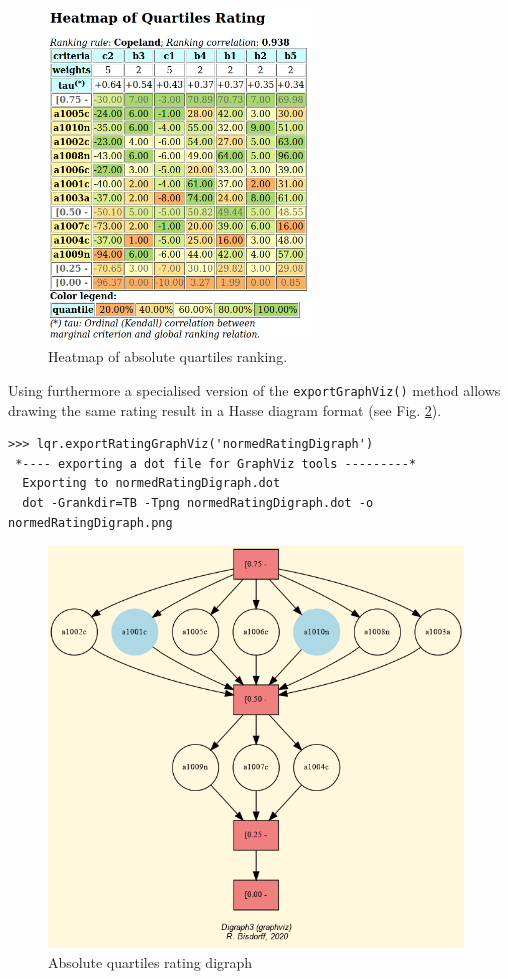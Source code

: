 \begin{figure}[h]
\sidecaption
 \includegraphics[width=7cm]{Figures/heatMap1.png}
\caption{Heatmap of absolute quartiles ranking.}
\label{fig:10.2}       %
\end{figure}
	    
Using furthermore a specialised version of the \texttt{exportGraphViz()} method allows drawing the same rating result in a Hasse diagram format (see Fig. \ref{fig:10.3}).

\begin{lstlisting}
>>> lqr.exportRatingGraphViz('normedRatingDigraph')
 *---- exporting a dot file for GraphViz tools ---------*
  Exporting to normedRatingDigraph.dot
  dot -Grankdir=TB -Tpng normedRatingDigraph.dot -o normedRatingDigraph.png
\end{lstlisting}

\begin{figure}[h]
  \includegraphics[width=11cm]{Figures/normedRatingDigraph.png}
\caption{Absolute quartiles rating digraph}
\label{fig:10.3}       %
\end{figure}

